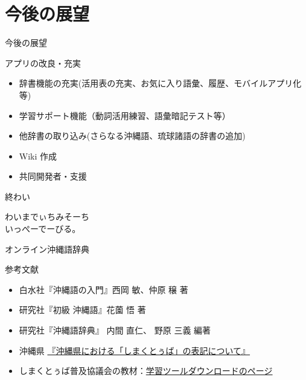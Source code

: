 \documentclass[14pt]{beamer}
\begin{document}
\section{今後の展望}
\begin{frame}{今後の展望}
  \begin{block}{アプリの改良・充実}
    \begin{itemize}
    \item 辞書機能の充実(活用表の充実、お気に入り語彙、履歴、モバイルアプリ化等)
    \item 学習サポート機能（動詞活用練習、語彙暗記テスト等）
    \item 他辞書の取り込み(さらなる沖縄語、琉球諸語の辞書の追加)
    \item Wiki 作成
    \item 共同開発者・支援
    \end{itemize}
  \end{block}
\end{frame}
\begin{frame}{終わい}
  \begin{center}
  \LARGE{わいまでぃちみそーち\\いっぺーでーびる。}
  \end{center}
\end{frame}

\begin{frame}{オンライン沖縄語辞典}
  \begin{block}{参考文献}
    \vspace{0pt}
    \begin{itemize}
    \item 白水社『沖縄語の入門』西岡 敏、仲原 穣 著
    \item 研究社『初級 沖縄語』花薗 悟 著
    \item 研究社『沖縄語辞典』 内間 直仁、 野原 三義 編著
    \item 沖縄県 \href{https://www.pref.okinawa.lg.jp/bunkakoryu/bunkageijutsu/1022484/1009625.html}{『沖縄県における「しまくとぅば」の表記について』}
    \item しまくとぅば普及協議会の教材：\href{https://shimakutuba.jp/learn/document/}{学習ツールダウンロードのページ}
    \end{itemize}
  \end{block}
\end{frame}
\end{document}
